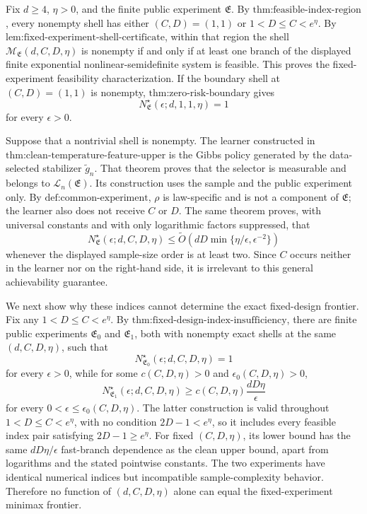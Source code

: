 Fix \(d\ge4\), \(\eta>0\), and the finite public experiment \(\mathfrak E\). By \(\text{thm:feasible-index-region}\), every nonempty shell has either \((C,D)=(1,1)\) or \(1<D\le C<e^\eta\). By \(\text{lem:fixed-experiment-shell-certificate}\), within that region the shell \(\mathcal M_{\mathfrak E}(d,C,D,\eta)\) is nonempty if and only if at least one branch of the displayed finite exponential nonlinear-semidefinite system is feasible. This proves the fixed-experiment feasibility characterization. If the boundary shell at \((C,D)=(1,1)\) is nonempty, \(\text{thm:zero-risk-boundary}\) gives
\[
N^\star_{\mathfrak E}(\epsilon;d,1,1,\eta)=1
\]
for every \(\epsilon>0\).

Suppose that a nontrivial shell is nonempty. The learner constructed in \(\text{thm:clean-temperature-feature-upper}\) is the Gibbs policy generated by the data-selected stabilizer \(\widetilde g_n\). That theorem proves that the selector is measurable and belongs to \(\mathcal L_n(\mathfrak E)\). Its construction uses the sample and the public experiment only. By \(\text{def:common-experiment}\), \(\rho\) is law-specific and is not a component of \(\mathfrak E\); the learner also does not receive \(C\) or \(D\). The same theorem proves, with universal constants and with only logarithmic factors suppressed, that
\[
N^\star_{\mathfrak E}(\epsilon;d,C,D,\eta)
\le\widetilde O\!\left(dD\min\{\eta/\epsilon,\epsilon^{-2}\}\right)
\]
whenever the displayed sample-size order is at least two. Since \(C\) occurs neither in the learner nor on the right-hand side, it is irrelevant to this general achievability guarantee.

We next show why these indices cannot determine the exact fixed-design frontier. Fix any \(1<D\le C<e^\eta\). By \(\text{thm:fixed-design-index-insufficiency}\), there are finite public experiments \(\mathfrak E_0\) and \(\mathfrak E_1\), both with nonempty exact shells at the same \((d,C,D,\eta)\), such that
\[
N^\star_{\mathfrak E_0}(\epsilon;d,C,D,\eta)=1
\]
for every \(\epsilon>0\), while for some \(c(C,D,\eta)>0\) and \(\epsilon_0(C,D,\eta)>0\),
\[
N^\star_{\mathfrak E_1}(\epsilon;d,C,D,\eta)
\ge c(C,D,\eta)\frac{dD\eta}{\epsilon}
\]
for every \(0<\epsilon\le\epsilon_0(C,D,\eta)\). The latter construction is valid throughout \(1<D\le C<e^\eta\), with no condition \(2D-1<e^\eta\), so it includes every feasible index pair satisfying \(2D-1\ge e^\eta\). For fixed \((C,D,\eta)\), its lower bound has the same \(dD\eta/\epsilon\) fast-branch dependence as the clean upper bound, apart from logarithms and the stated pointwise constants. The two experiments have identical numerical indices but incompatible sample-complexity behavior. Therefore no function of \((d,C,D,\eta)\) alone can equal the fixed-experiment minimax frontier.


